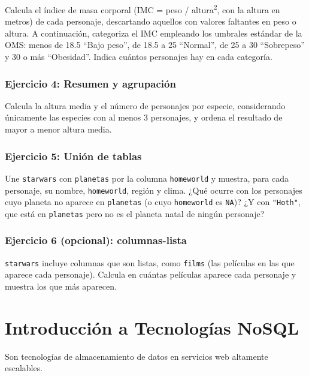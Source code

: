 \documentclass[
]{book}
\theoremstyle{break}
\theoremstyle{nonumberplain}
\begin{document}
Calcula el índice de masa corporal (IMC = peso / altura\textsuperscript{2}, con la altura en
metros) de cada personaje, descartando aquellos con valores faltantes en
peso o altura. A continuación, categoriza el IMC empleando los umbrales
estándar de la OMS: menos de 18.5 ``Bajo peso'', de 18.5 a 25 ``Normal'', de 25
a 30 ``Sobrepeso'' y 30 o más ``Obesidad''. Indica cuántos personajes hay en
cada categoría.

\subsection{Ejercicio 4: Resumen y agrupación}\label{ejercicio-4-resumen-y-agrupaciuxf3n-1}

Calcula la altura media y el número de personajes por especie, considerando
únicamente las especies con al menos 3 personajes, y ordena el resultado de
mayor a menor altura media.

\subsection{Ejercicio 5: Unión de tablas}\label{ejercicio-5-uniuxf3n-de-tablas-1}

Une \texttt{starwars} con \texttt{planetas} por la columna \texttt{homeworld} y muestra, para cada
personaje, su nombre, \texttt{homeworld}, región y clima. ¿Qué ocurre con los
personajes cuyo planeta no aparece en \texttt{planetas} (o cuyo \texttt{homeworld} es
\texttt{NA})? ¿Y con \texttt{"Hoth"}, que está en \texttt{planetas} pero no es el planeta natal de
ningún personaje?

\subsection{Ejercicio 6 (opcional): columnas-lista}\label{ejercicio-6-opcional-columnas-lista-1}

\texttt{starwars} incluye columnas que son listas, como \texttt{films} (las películas en
las que aparece cada personaje). Calcula en cuántas películas aparece cada
personaje y muestra los que más aparecen.

\chapter{Introducción a Tecnologías NoSQL}\label{introducciuxf3n-a-tecnologuxedas-nosql}

Son tecnologías de almacenamiento de datos en servicios web altamente escalables.
\end{document}
